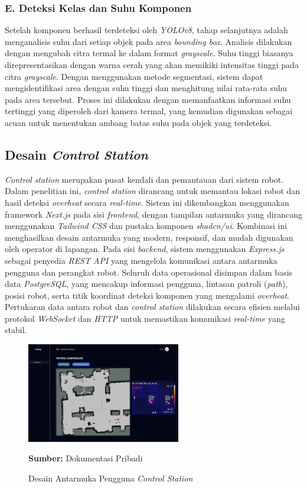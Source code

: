 \subsubsection*{E. Deteksi Kelas dan Suhu Komponen}
Setelah komponen berhasil terdeteksi oleh \emph{YOLOv8}, tahap selanjutnya adalah menganalisis suhu dari setiap objek pada area \emph{bounding box}. Analisis dilakukan dengan mengubah citra termal ke dalam format \emph{grayscale}. Suhu tinggi biasanya direpresentasikan dengan warna cerah yang akan memikiki intensitas tinggi pada citra \emph{grayscale}. Dengan menggunakan metode segmentasi, sistem dapat mengidentifikasi area dengan suhu tinggi dan menghitung nilai rata-rata suhu pada area tersebut. Proses ini dilakukan dengan memanfaatkan informasi suhu tertinggi yang diperoleh dari kamera termal, yang kemudian digunakan sebagai acuan untuk menentukan ambang batas suhu pada objek yang terdeteksi.


\subsection{Desain \textit{Control Station}}

\emph{Control station} merupakan pusat kendali dan pemantauan dari sistem robot. Dalam penelitian ini, \emph{control station} dirancang untuk memantau lokasi robot dan hasil deteksi \emph{overheat} secara \emph{real-time}. Sistem ini dikembangkan menggunakan framework \emph{Next.js} pada sisi \emph{frontend}, dengan tampilan antarmuka yang dirancang menggunakan \emph{Tailwind CSS} dan pustaka komponen \emph{shadcn/ui}. Kombinasi ini menghasilkan desain antarmuka yang modern, responsif, dan mudah digunakan oleh operator di lapangan. Pada sisi \emph{backend}, sistem menggunakan \emph{Express.js} sebagai penyedia \emph{REST API} yang mengelola komunikasi antara antarmuka pengguna dan perangkat robot. Seluruh data operasional disimpan dalam basis data \emph{PostgreSQL}, yang mencakup informasi pengguna, lintasan patroli (\emph{path}), posisi robot, serta titik koordinat deteksi komponen yang mengalami \emph{overheat}. Pertukaran data antara robot dan \emph{control station} dilakukan secara efisien melalui protokol \emph{WebSocket} dan \emph{HTTP} untuk memastikan komunikasi \emph{real-time} yang stabil.
\begin{figure}[H]
  \centering
  \includegraphics[width=0.6\textwidth]{gambar/bab3/control-station.png}
  \caption{Desain Antarmuka Pengguna \emph{Control Station}}
  \label{fig:control-station}
  \footnotesize{\textbf{Sumber:} Dokumentasi Pribadi}
\end{figure}


